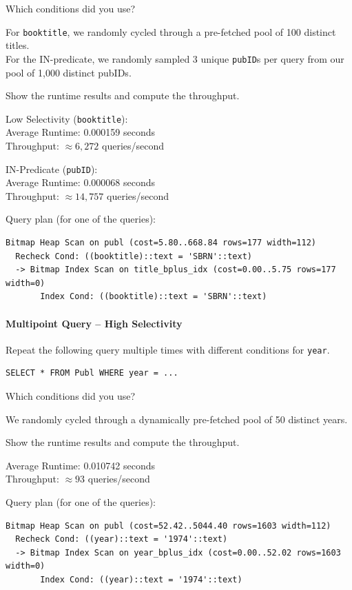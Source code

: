 \documentclass[11pt]{scrartcl}
\begin{document}
Which conditions did you use?

For \texttt{booktitle}, we randomly cycled through a pre-fetched pool of 100 distinct titles. \\
For the IN-predicate, we randomly sampled 3 unique \texttt{pubID}s per query from our pool of 1,000 distinct pubIDs.

Show the runtime results and compute the throughput.

Low Selectivity (\texttt{booktitle}): \\
Average Runtime: 0.000159 seconds \\
Throughput: $\approx 6,272$ queries/second

\vspace{0.5em}
IN-Predicate (\texttt{pubID}): \\
Average Runtime: 0.000068 seconds \\
Throughput: $\approx 14,757$ queries/second

Query plan (for one of the queries):

{\small
\parskip0pt\begin{verbatim}
Bitmap Heap Scan on publ (cost=5.80..668.84 rows=177 width=112)
  Recheck Cond: ((booktitle)::text = 'SBRN'::text)
  -> Bitmap Index Scan on title_bplus_idx (cost=0.00..5.75 rows=177 width=0)
       Index Cond: ((booktitle)::text = 'SBRN'::text)
\end{verbatim}}

\paragraph{Multipoint Query -- High Selectivity}

Repeat the following query multiple times with different conditions for \texttt{year}.

\begin{lstlisting}[style=dbtsql]
SELECT * FROM Publ WHERE year = ...
\end{lstlisting}

Which conditions did you use?

We randomly cycled through a dynamically pre-fetched pool of 50 distinct years.

Show the runtime results and compute the throughput.

Average Runtime: 0.010742 seconds \\
Throughput: $\approx 93$ queries/second

Query plan (for one of the queries):

{\small
\parskip0pt\begin{verbatim}
Bitmap Heap Scan on publ (cost=52.42..5044.40 rows=1603 width=112)
  Recheck Cond: ((year)::text = '1974'::text)
  -> Bitmap Index Scan on year_bplus_idx (cost=0.00..52.02 rows=1603 width=0)
       Index Cond: ((year)::text = '1974'::text)
\end{verbatim}}
\end{document}
